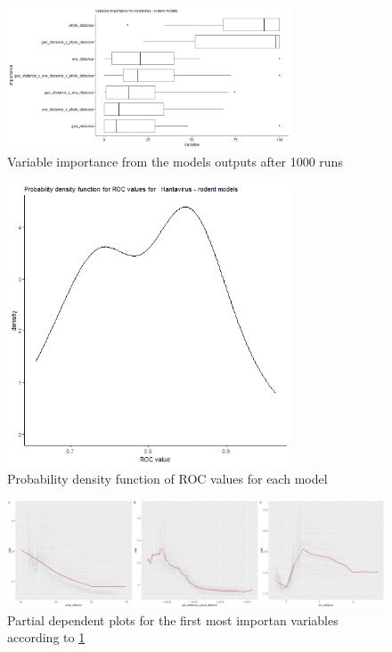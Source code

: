 \documentclass{article}
\begin{document}
\begin{figure}[tbhp]
    \centering
    \includegraphics[width=0.75\textwidth]{03_vip_rodents.png}
    \caption{Variable importance from the models outputs after 1000 runs}
    \label{fig:vip}
\end{figure}

\begin{figure}[tbhp]
    \centering
    \includegraphics[width=0.75\textwidth]{04_p_roc_density.png}
    \caption{Probability density function of ROC values for each model}
    \label{fig:rocdensity}
\end{figure}
\begin{figure}[tbhp]
    \centering
    \includegraphics[width=1\textwidth]{05_pdp_top3.png}
    \caption{Partial dependent plots for the first most importan variables according to \ref{fig:vip}}
    \label{fig:density}
\end{figure}




\end{document}
